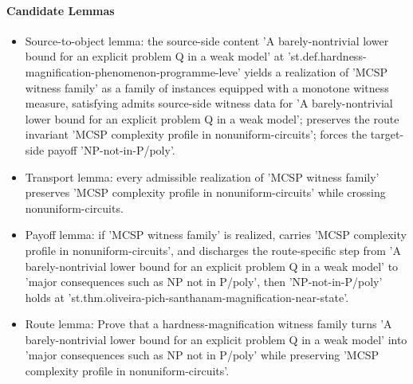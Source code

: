 \documentclass[11pt]{article}
\begin{document}
\paragraph{Candidate Lemmas}
\begin{itemize}[leftmargin=*,itemsep=0.2em]
\item Source-to-object lemma: the source-side content 'A barely-nontrivial lower bound for an explicit problem Q in a weak model' at 'st.def.hardness-magnification-phenomenon-programme-leve' yields a realization of 'MCSP witness family' as a family of instances equipped with a monotone witness measure, satisfying admits source-side witness data for 'A barely-nontrivial lower bound for an explicit problem Q in a weak model'; preserves the route invariant 'MCSP complexity profile in nonuniform-circuits'; forces the target-side payoff 'NP-not-in-P/poly'.
\item Transport lemma: every admissible realization of 'MCSP witness family' preserves 'MCSP complexity profile in nonuniform-circuits' while crossing nonuniform-circuits.
\item Payoff lemma: if 'MCSP witness family' is realized, carries 'MCSP complexity profile in nonuniform-circuits', and discharges the route-specific step from 'A barely-nontrivial lower bound for an explicit problem Q in a weak model' to 'major consequences such as NP not in P/poly', then 'NP-not-in-P/poly' holds at 'st.thm.oliveira-pich-santhanam-magnification-near-state'.
\item Route lemma: Prove that a hardness-magnification witness family turns 'A barely-nontrivial lower bound for an explicit problem Q in a weak model' into 'major consequences such as NP not in P/poly' while preserving 'MCSP complexity profile in nonuniform-circuits'.
\end{itemize}
\end{document}
